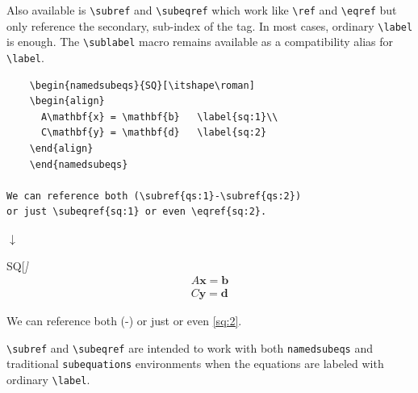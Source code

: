 \documentclass{article}
\begin{document}
Also available is \verb|\subref| and \verb|\subeqref| which work like \verb|\ref| and \verb|\eqref| but only reference the secondary, sub-index of the tag. In most cases, ordinary \verb|\label| is enough. The \verb|\sublabel| macro remains available as a compatibility alias for \verb|\label|.
\begin{tcolorbox}
  \begin{verbatim}
    \begin{namedsubeqs}{SQ}[\itshape\roman]
    \begin{align}
      A\mathbf{x} = \mathbf{b}   \label{sq:1}\\
      C\mathbf{y} = \mathbf{d}   \label{sq:2}
    \end{align}
    \end{namedsubeqs}

We can reference both (\subref{qs:1}-\subref{qs:2})
or just \subeqref{sq:1} or even \eqref{sq:2}.
  \end{verbatim}
\Vtrg
\begin{center}$\downarrow$\end{center}
\vtrg
    \begin{namedsubeqs}{SQ}[\itshape\roman]
    \begin{align}
      A\mathbf{x} = \mathbf{b}   \label{sq:1}\\
      C\mathbf{y} = \mathbf{d}   \label{sq:2}
    \end{align}
    \end{namedsubeqs}
We can reference both (-) 
or just  or even \eqref{sq:2}.
\end{tcolorbox}
\verb|\subref| and \verb|\subeqref| are intended to work with both \verb|namedsubeqs| and traditional \verb|subequations| environments when the equations are labeled with ordinary \verb|\label|.
\end{document}

